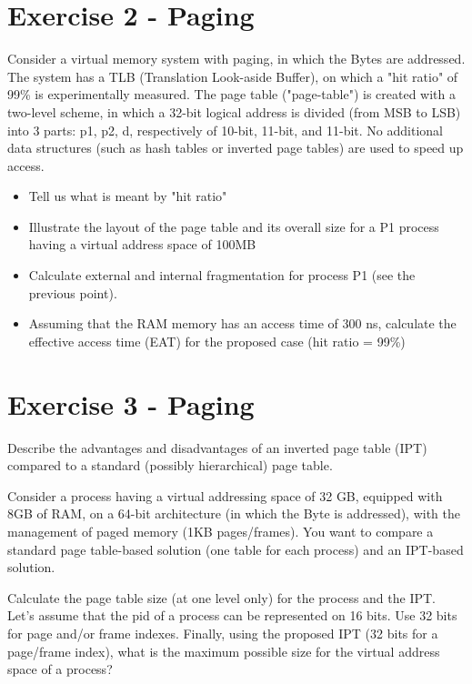 \section{Exercise 2 - Paging}

Consider a virtual memory system with paging, in which the Bytes are addressed. The system has a TLB (Translation Look-aside Buffer), on which a "hit ratio" of 99\% is experimentally measured. The page table ("page-table") is created with a two-level scheme, in which a 32-bit logical address is divided (from MSB to LSB) into 3 parts: p1, p2, d, respectively of 10-bit, 11-bit, and 11-bit. No additional data structures (such as hash tables or inverted page tables) are used to speed up access.

\begin{itemize}
\item Tell us what is meant by "hit ratio"
\item	Illustrate the layout of the page table and its overall size for a P1 process having a virtual address space of 100MB
\item Calculate external and internal fragmentation for process P1 (see the previous point).
\item Assuming that the RAM memory has an access time of 300 ns, calculate the effective access time (EAT) for the proposed case (hit ratio = 99\%)
\end{itemize}


\section{Exercise 3 - Paging}

Describe the advantages and disadvantages of an inverted page table (IPT) compared to a standard (possibly hierarchical) page table. 

Consider a process having a virtual addressing space of 32 GB, equipped with 8GB of RAM, on a 64-bit architecture (in which the Byte is addressed), with the management of paged memory (1KB pages/frames). You want to compare a standard page table-based solution (one table for each process) and an IPT-based solution. 

Calculate the page table size (at one level only) for the process and the IPT. Let's assume that the pid of a process can be represented on 16 bits. Use 32 bits for page and/or frame indexes. Finally, using the proposed IPT (32 bits for a page/frame index), what is the maximum possible size for the virtual address space of a process?

